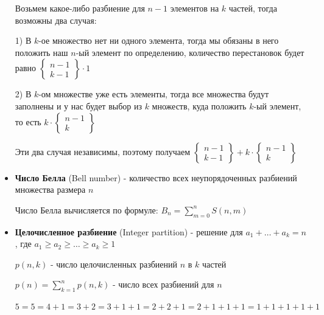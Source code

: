 \documentclass[12pt]{article}
\begin{document}
\begin{itemize}
        Возьмем какое-либо разбиение для $n - 1$ элементов на $k$ частей, тогда возможны два случая:

        1) В $k$-ое множество нет ни одного элемента, тогда мы обязаны в него положить наш $n$-ый элемент по определению,
        количество перестановок будет равно $\begin{Bmatrix}
                                                 n - 1 \\ k - 1
        \end{Bmatrix} \cdot 1$

        2) В $k$-ом множестве уже есть элементы, тогда все множества будут заполнены и у нас будет выбор из $k$ множеств,
        куда положить $k$-ый элемент, то есть $k \cdot \begin{Bmatrix}
                                                           n - 1 \\ k
        \end{Bmatrix}$

        Эти два случая независимы, поэтому получаем $\begin{Bmatrix}
                                                         n - 1 \\ k - 1
        \end{Bmatrix} + k \cdot \begin{Bmatrix}
                                    n - 1 \\ k
        \end{Bmatrix}$

        \vspace{5mm}
        \item \textbf{Число Белла} (Bell number) - количество всех неупорядоченных разбиений множества размера $n$

        Число Белла вычисляется по формуле: $B_n = \sum_{m=0}^n S(n, m)$

        \vspace{5mm}
        \item \textbf{Целочисленное разбиение} (Integer partition) - решение для $a_1 + \dots + a_k = n$, где $a_1 \geq a_2 \geq \dots \geq a_k \geq 1$

        $p(n, k)$ - число целочисленных разбиений $n$ в $k$ частей

        $p(n) = \sum_{k = 1}^n p(n, k)$ - число всех разбиений для $n$

        \Ex $5 = 5 = 4 + 1 = 3 + 2 = 3 + 1 + 1 = 2 + 2 + 1 = 2 + 1 + 1 + 1 = 1 + 1 + 1 + 1 + 1$

        \vspace{5mm}

    \end{itemize}
\end{document}
